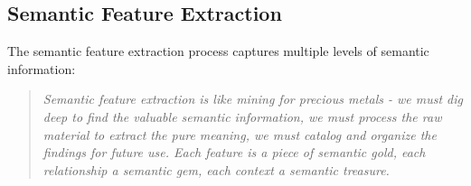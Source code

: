 \documentclass[11pt]{article}
\begin{document}
\subsection{Semantic Feature Extraction}

The semantic feature extraction process captures multiple levels of semantic information:

\begin{quote}
\emph{Semantic feature extraction is like mining for precious metals - we must dig deep to find the valuable semantic information, we must process the raw material to extract the pure meaning, we must catalog and organize the findings for future use. Each feature is a piece of semantic gold, each relationship a semantic gem, each context a semantic treasure.}
\end{quote}
\end{document}

